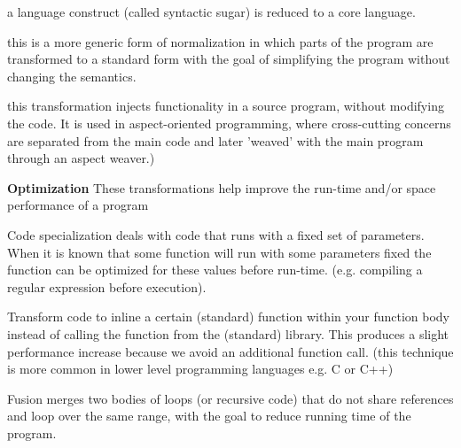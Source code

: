 \begin{description}[font=\normalfont,align=right,leftmargin=!, labelwidth=\widthof{{\bfseries Specialization}},labelsep=2em]
	\item[Desugaring] a language construct (called syntactic sugar) is reduced to a core language.
	\item[Simplification] this is a more generic form of normalization in which parts of the program are transformed to a standard form with the goal of simplifying the program without changing the semantics.
	\item[Weaving] this transformation injects functionality in a source program, without modifying the code. It is used in aspect-oriented programming, where cross-cutting concerns are separated from the main code and later 'weaved' with the main program through an aspect weaver.)                                                                                                                                                                              
\end{description}

\textbf{Optimization}
These transformations help improve the run-time and/or space performance of a program                                                                                        

\begin{description}[font=\normalfont,align=right,leftmargin=!, labelwidth=\widthof{{\bfseries Specialization}},labelsep=2em]
	\item[Specialization] Code specialization deals with code that runs with a fixed set of parameters. When it is known that some function will run with some parameters fixed the function can be optimized for these values before run-time. (e.g. compiling a regular expression before execution).                                                                                                                                                                              
	\item[Inlining] Transform code to inline a certain (standard) function within your function body instead of calling the function from the (standard) library. This produces a slight performance increase because we avoid an additional function call. (this technique is more common in lower level programming languages e.g. C or C++)                                                                                                                                                                             
	\item[Fusion] Fusion merges two bodies of loops (or recursive code) that do not share references and loop over the same range, with the goal to reduce running time of the program.                                                                                                                                                                              
\end{description}

